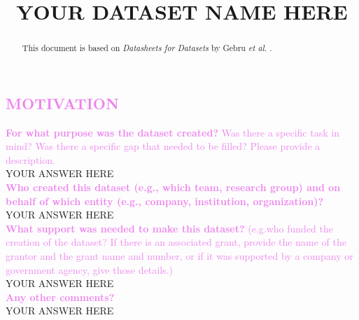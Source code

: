 \documentclass[letterpaper, 10 pt, conference]{ieeeconf}  %
\title{\LARGE \bf
YOUR DATASET NAME HERE
}
\newcommand{\sectioncolor}{violet}
\begin{document}
\maketitle
\thispagestyle{empty}
\pagestyle{empty}


\begin{abstract}

This document is based on \textit{Datasheets for Datasets} by Gebru \textit{et al.} \cite{gebruDatasheetsDatasets2020}.

\end{abstract}


\begin{mdframed}[linecolor=\sectioncolor]
\section*{\textcolor{\sectioncolor}{
MOTIVATION
}}
\end{mdframed}
    \textcolor{\sectioncolor}{\textbf{
    For what purpose was the dataset created?
    }
    Was there a specific task in mind? Was there
    a specific gap that needed to be filled? Please provide a description.
    } \\
    YOUR ANSWER HERE \\
    
    \textcolor{\sectioncolor}{\textbf{
    Who created this dataset (e.g., which team, research group) and on behalf of which entity (e.g., company, institution, organization)?
    }
    } \\
    YOUR ANSWER HERE \\
    
    \textcolor{\sectioncolor}{\textbf{
    What support was needed to make this dataset?
    }
    (e.g.who funded the creation of the dataset? If there is an associated grant, provide the name of the grantor and the grant name and number, or if it was supported by a company or government agency, give those details.)
    } \\
    YOUR ANSWER HERE \\
    
    \textcolor{\sectioncolor}{\textbf{
    Any other comments?
    }} \\
    YOUR ANSWER HERE \\
\end{document}
